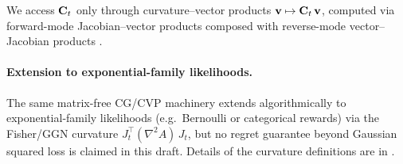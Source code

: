 We access $\mathbf{C}_t$ only through curvature--vector products
$\mathbf{v}\mapsto\mathbf{C}_t\,\mathbf{v}$, computed via forward-mode Jacobian--vector
products composed with reverse-mode vector--Jacobian products
\citep{pearlmutter1994fast,schraudolph2002fast}.



\paragraph{Extension to exponential-family likelihoods.}%
The same matrix-free CG/CVP machinery extends algorithmically to
exponential-family likelihoods (e.g.\ Bernoulli or categorical rewards)
via the Fisher/GGN curvature $J_t^\top(\nabla^2 A)\,J_t$, but no regret
guarantee beyond Gaussian squared loss is claimed in this draft.
Details of the curvature definitions are in .




